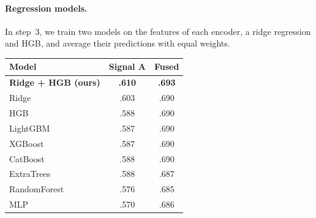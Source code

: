 \paragraph{Regression models.} In step~3, we train two models on the features of each encoder, a
ridge regression and HGB, and average their predictions with equal weights. %

\begin{table}[t]
\centering
\small
\setlength{\tabcolsep}{4pt}
\begin{tabular}{lcc}
\toprule
Model & Signal A & Fused \\
\midrule
\textbf{Ridge + HGB (ours)} & \textbf{.610} & \textbf{.693} \\ %
\midrule
Ridge                & .603 & .690 \\ %
HGB                  & .588 & .690 \\ %
LightGBM             & .587 & .690 \\ %
XGBoost              & .587 & .690 \\ %
CatBoost             & .588 & .690 \\ %
ExtraTrees           & .588 & .687 \\ %
RandomForest         & .576 & .685 \\ %
MLP                  & .570 & .686 \\ %
\midrule

\end{tabular}
\end{table}
